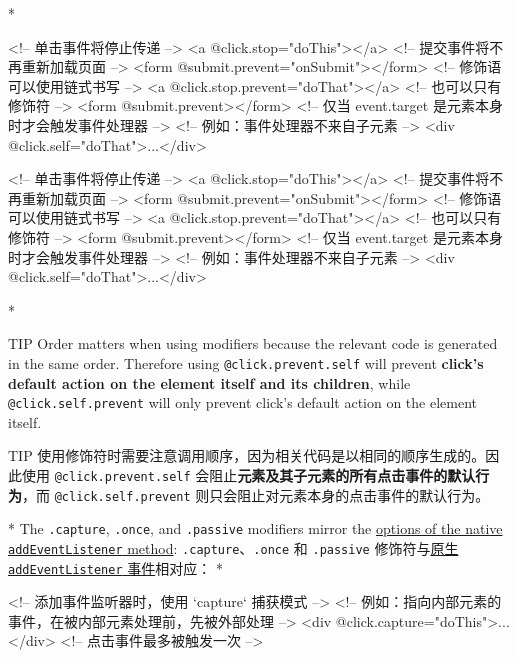 \begin{paracol}{2}
\switchcolumn[0]*%
\begin{codeHtml}
<!-- 单击事件将停止传递 -->
<a @click.stop="doThis"></a>
<!-- 提交事件将不再重新加载页面 -->
<form @submit.prevent="onSubmit"></form>
<!-- 修饰语可以使用链式书写 -->
<a @click.stop.prevent="doThat"></a>
<!-- 也可以只有修饰符 -->
<form @submit.prevent></form>
<!-- 仅当 event.target 是元素本身时才会触发事件处理器 -->
<!-- 例如：事件处理器不来自子元素 -->
<div @click.self="doThat">...</div>
\end{codeHtml}
\switchcolumn
\begin{codeHtml}
<!-- 单击事件将停止传递 -->
<a @click.stop="doThis"></a>
<!-- 提交事件将不再重新加载页面 -->
<form @submit.prevent="onSubmit"></form>
<!-- 修饰语可以使用链式书写 -->
<a @click.stop.prevent="doThat"></a>
<!-- 也可以只有修饰符 -->
<form @submit.prevent></form>
<!-- 仅当 event.target 是元素本身时才会触发事件处理器 -->
<!-- 例如：事件处理器不来自子元素 -->
<div @click.self="doThat">...</div>
\end{codeHtml}
\switchcolumn[0]*%
\begin{vueQuote}{TIP}
Order matters when using modifiers because the relevant code is
generated in the same order. Therefore using
\texttt{@click.prevent.self} will prevent \textbf{click's default action
on the element itself and its children}, while
\texttt{@click.self.prevent} will only prevent click's default action on
the element itself.
\end{vueQuote}
\switchcolumn
\begin{vueQuote}{TIP}
使用修饰符时需要注意调用顺序，因为相关代码是以相同的顺序生成的。因此使用
\texttt{@click.prevent.self}
会阻止\textbf{元素及其子元素的所有点击事件的默认行为}，而
\texttt{@click.self.prevent} 则只会阻止对元素本身的点击事件的默认行为。
\end{vueQuote}
\switchcolumn[0]*%
The \texttt{.capture}, \texttt{.once}, and \texttt{.passive} modifiers
mirror the
\href{https://developer.mozilla.org/en-US/docs/Web/API/EventTarget/addEventListener\#options}{options
of the native \texttt{addEventListener} method}:
\switchcolumn
\texttt{.capture}、\texttt{.once} 和 \texttt{.passive}
修饰符与\href{https://developer.mozilla.org/zh-CN/docs/Web/API/EventTarget/addEventListener\#options}{原生
\texttt{addEventListener} 事件}相对应：
\switchcolumn[0]*%
\begin{codeHtml}
<!-- 添加事件监听器时，使用 `capture` 捕获模式 -->
<!-- 例如：指向内部元素的事件，在被内部元素处理前，先被外部处理 -->
<div @click.capture="doThis">...</div>
<!-- 点击事件最多被触发一次 -->

\end{codeHtml}
\end{paracol}
